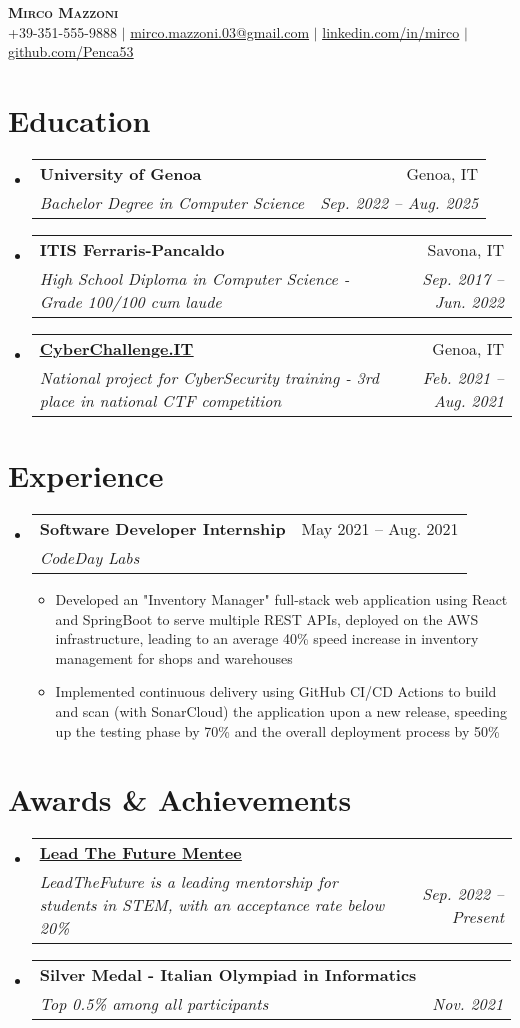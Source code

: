 \documentclass[letterpaper,11pt]{article}
\makeatletter
\newcommand{\resumeItem}[1]{
  \item\small{
    {#1 \vspace{-2pt}}
  }
}
\newcommand{\resumeSubheading}[4]{
  \vspace{-2pt}\item
    \begin{tabular*}{0.97\textwidth}[t]{l@{\extracolsep{\fill}}r}
      \textbf{#1} & #2 \\
      \textit{\small#3} & \textit{\small #4} \\
    \end{tabular*}\vspace{-7pt}
}
\newcommand{\resumeSubHeadingListStart}{\begin{itemize}[leftmargin=0.15in, label={}]}
\newcommand{\resumeSubHeadingListEnd}{\end{itemize}}
\newcommand{\resumeItemListStart}{\begin{itemize}}
\newcommand{\resumeItemListEnd}{\end{itemize}\vspace{-5pt}}
\makeatother
\begin{document}
\begin{center}
    \textbf{\Huge \scshape Mirco Mazzoni} \\ \vspace{1pt}
    \small +39-351-555-9888 $|$ \href{mailto:mirco.mazzoni.03@gmail.com}{\underline{mirco.mazzoni.03@gmail.com}} $|$ 
    \href{https://www.linkedin.com/in/mirco-mazzoni-022816219/}{\underline{linkedin.com/in/mirco}} $|$
    \href{https://github.com/Penca53}{\underline{github.com/Penca53}}
\end{center}


\section{Education}
  \resumeSubHeadingListStart
     \resumeSubheading
      {University of Genoa}{Genoa, IT}
      {Bachelor Degree in Computer Science}{Sep. 2022 -- Aug. 2025}
      \resumeSubheading
      {ITIS Ferraris-Pancaldo}{Savona, IT}
      {High School Diploma in Computer Science - Grade 100/100 cum laude}{Sep. 2017 -- Jun. 2022}
     \resumeSubheading
      {\href{https://cyberchallenge.it/halloffame/2021}{\underline{CyberChallenge.IT}}}{Genoa, IT}
      {National project for CyberSecurity training - 3rd place in national CTF competition}{Feb. 2021 -- Aug. 2021}
  \resumeSubHeadingListEnd


\section{Experience}
  \resumeSubHeadingListStart

    \resumeSubheading
      {Software Developer Internship}{May 2021 -- Aug. 2021}
      {CodeDay Labs}{}
      \resumeItemListStart
        \resumeItem{Developed an "Inventory Manager" full-stack web application using React and SpringBoot to serve multiple REST APIs, deployed on the AWS infrastructure, leading to an average 40\% speed increase in inventory management for shops and warehouses}
        \resumeItem{Implemented continuous delivery using GitHub CI/CD Actions to build and scan (with SonarCloud) the application upon a new release, speeding up the testing phase by 70\% and the overall deployment process by 50\% }
      \resumeItemListEnd
    \resumeSubHeadingListEnd

\section{Awards \& Achievements}
  \resumeSubHeadingListStart
     \resumeSubheading
      {\href{https://www.linkedin.com/company/leadthefuture/mycompany/}{\underline{Lead The Future Mentee}}}{}
      {LeadTheFuture is a leading mentorship for students in STEM, with an acceptance rate below 20\%}{Sep. 2022 -- Present}
      \resumeSubheading
      {Silver Medal - Italian Olympiad in Informatics}{}
      {Top 0.5\% among all participants}{Nov. 2021}
  \resumeSubHeadingListEnd
\end{document}
